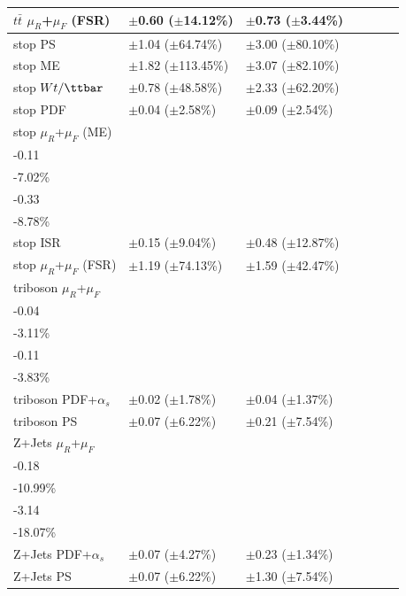 \begin{table}[ht]
{\begin{tabular}{l l l l l l l }
\midrule
\(t\bar{t}\) \(\mu_R\)+\(\mu_F\) (FSR) & \(\pm\)0.60 (\(\pm\)14.12\%) &\(\pm\)0.73 (\(\pm\)3.44\%) \tabularnewline
\midrule
stop PS & \(\pm\)1.04 (\(\pm\)64.74\%) &\(\pm\)3.00 (\(\pm\)80.10\%) \tabularnewline
\midrule
stop ME & \(\pm\)1.82 (\(\pm\)113.45\%) &\(\pm\)3.07 (\(\pm\)82.10\%) \tabularnewline
\midrule
stop \(Wt/\ttbar\) & \(\pm\)0.78 (\(\pm\)48.58\%) &\(\pm\)2.33 (\(\pm\)62.20\%) \tabularnewline
\midrule
stop PDF & \(\pm\)0.04 (\(\pm\)2.58\%) &\(\pm\)0.09 (\(\pm\)2.54\%) \tabularnewline
\midrule
stop \(\mu_R\)+\(\mu_F\) (ME) & \(\substack{+0.15\\-0.11}\) \big(\(\substack{+9.24\%\\-7.02\%}\)\big) & \(\substack{+0.39\\-0.33}\) \big(\(\substack{+10.45\%\\-8.78\%}\)\big) \tabularnewline
\midrule
stop ISR & \(\pm\)0.15 (\(\pm\)9.04\%) &\(\pm\)0.48 (\(\pm\)12.87\%) \tabularnewline
\midrule
stop \(\mu_R\)+\(\mu_F\) (FSR) & \(\pm\)1.19 (\(\pm\)74.13\%) &\(\pm\)1.59 (\(\pm\)42.47\%) \tabularnewline
\midrule
triboson  \(\mu_R\)+\(\mu_F\) & \(\substack{+0.04\\-0.04}\) \big(\(\substack{+3.58\%\\-3.11\%}\)\big) & \(\substack{+0.12\\-0.11}\) \big(\(\substack{+4.39\%\\-3.83\%}\)\big) \tabularnewline
\midrule
triboson PDF+\(\alpha_s\) & \(\pm\)0.02 (\(\pm\)1.78\%) &\(\pm\)0.04 (\(\pm\)1.37\%) \tabularnewline
\midrule
triboson PS & \(\pm\)0.07 (\(\pm\)6.22\%) &\(\pm\)0.21 (\(\pm\)7.54\%) \tabularnewline
\midrule
Z+Jets \(\mu_R\)+\(\mu_F\) & \(\substack{+0.32\\-0.18}\) \big(\(\substack{+20.15\%\\-10.99\%}\)\big) & \(\substack{+2.49\\-3.14}\) \big(\(\substack{+14.33\%\\-18.07\%}\)\big) \tabularnewline
\midrule
Z+Jets PDF+\(\alpha_s\) & \(\pm\)0.07 (\(\pm\)4.27\%) &\(\pm\)0.23 (\(\pm\)1.34\%) \tabularnewline
\midrule
Z+Jets PS & \(\pm\)0.07 (\(\pm\)6.22\%) &\(\pm\)1.30 (\(\pm\)7.54\%) \tabularnewline
\bottomrule
\end{tabular}}
\end{table}

